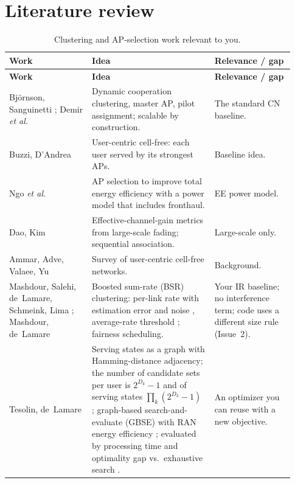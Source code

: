\documentclass[11pt]{article}
\begin{document}
\section{Literature review}
\label{sec:lit}

\begin{longtable}{@{}p{0.27\linewidth}p{0.40\linewidth}p{0.26\linewidth}@{}}
\caption{Clustering and AP-selection work relevant to you.}\\
\toprule
\textbf{Work} & \textbf{Idea} & \textbf{Relevance / gap}\\
\midrule
\endfirsthead
\toprule
\textbf{Work} & \textbf{Idea} & \textbf{Relevance / gap}\\
\midrule
\endhead
Bj\"ornson, Sanguinetti \cite{bjornson2020scalable}; Demir \emph{et al.} \cite{demir2021foundations} & Dynamic cooperation clustering, master AP, pilot assignment; scalable by construction. & The standard CN baseline.\\
Buzzi, D'Andrea \cite{buzzi2017uc} & User-centric cell-free: each user served by its strongest APs. & Baseline idea.\\
Ngo \emph{et al.} \cite{ngo2018ee} & AP selection to improve total energy efficiency with a power model that includes fronthaul. & EE power model.\\
Dao, Kim \cite{dao2020effective} & Effective-channel-gain metrics from large-scale fading; sequential association. & Large-scale only.\\
Ammar, Adve, Valaee, Yu \cite{ammar2022survey} & Survey of user-centric cell-free networks. & Background.\\
Mashdour, Salehi, de~Lamare, Schmeink, Lima \cite{mashdour2024wcl}; Mashdour, de~Lamare \cite{mashdour2024study} & Boosted sum-rate (BSR) clustering: per-link rate with estimation error and noise \cite[eq.~(11)]{mashdour2024study}, average-rate threshold \cite[eqs.~(12)--(13)]{mashdour2024study}; fairness scheduling. & Your IR baseline; no interference term; code uses a different size rule (Issue~2).\\
Tesolin, de~Lamare \cite{tesolin2026gbse} & Serving states as a graph with Hamming-distance adjacency; the number of candidate sets per user is $2^{D_k}-1$ and of serving states $\prod_k(2^{D_k}-1)$ \cite[eqs.~(1)--(2)]{tesolin2026gbse}; graph-based search-and-evaluate (GBSE) with RAN energy efficiency \cite[Sec.~IV]{tesolin2026gbse}; evaluated by processing time and optimality gap vs.\ exhaustive search \cite[Sec.~IV-B, Fig.~1]{tesolin2026gbse}. & An optimizer you can reuse with a new objective.\\

\end{longtable}
\end{document}

